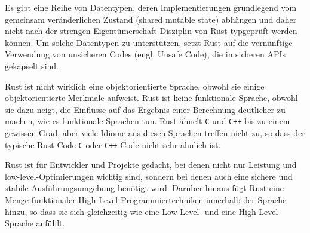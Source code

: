 Es gibt eine Reihe von Datentypen, deren Implementierungen grundlegend vom gemeinsam veränderlichen Zustand (shared mutable state) abhängen und daher nicht nach der strengen Eigentümerschaft-Disziplin von Rust typgeprüft werden können. Um solche Datentypen zu unterstützen, setzt Rust auf die vernünftige Verwendung von unsicheren Codes (engl. Unsafe Code), die in sicheren APIs gekapselt sind.





Rust ist nicht wirklich eine objektorientierte Sprache, obwohl sie einige objektorientierte Merkmale aufweist. Rust ist keine funktionale Sprache, obwohl sie dazu neigt, die Einflüsse auf das Ergebnis einer Berechnung deutlicher zu machen, wie es funktionale Sprachen tun. Rust ähnelt \texttt{C} und \texttt{C++} bis zu einem gewissen Grad, aber viele Idiome aus diesen Sprachen treffen nicht zu, so dass der typische Rust-Code \texttt{C} oder \texttt{C++}-Code nicht sehr ähnlich ist.

Rust ist für Entwickler und Projekte gedacht, bei denen nicht nur Leistung und low-level-Optimierungen wichtig sind, sondern bei denen auch eine sichere und stabile Ausführungsumgebung benötigt wird. Darüber hinaus fügt Rust eine Menge funktionaler High-Level-Programmiertechniken innerhalb der Sprache hinzu, so dass sie sich gleichzeitig wie eine Low-Level- und eine High-Level-Sprache anfühlt.



